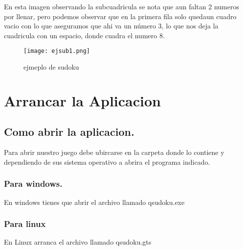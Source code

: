 \documentclass[11pt,fleqn]{book} %
\begin{document}
En esta imagen observando la subcuadricula se nota que aun faltan 2 numeros por llenar, pero podemos observar que en la primera fila solo quedaun cuadro vacio con lo que aseguramos que ahi va un número 3, lo que nos deja la cuadricula con un espacio, donde cuadra el numero 8.

\begin{figure}[h]
\centering\texttt{[image: ejsub1.png]}
\caption{ejmeplo de sudoku}
\end{figure}




\chapter{Arrancar la Aplicacion}

\section{Como abrir la aplicacion.}

Para abrir nuestro juego debe ubircarse en la carpeta donde lo contiene y dependiendo de sus sistema operativo a abrira el programa indicado.



\subsection{Para windows.}


En windows tienes que abrir el archivo llamado qsudoku.exe

\subsection{Para linux}


En Linux arranca el archivo llamado qsudoku.gts





\end{document}
